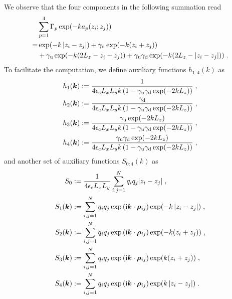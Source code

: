 We observe that the four components in the following summation read
\begin{align*}
     &\sum_{p=1}^4\Gamma_p\exp(-ka_p(z_i;z_j))\\  
     =&\exp(-k\left\lvert z_i-z_j\right\rvert)+\gamma_{\mathrm{d}}\exp(-k(z_i+z_j))\\
     &+\gamma_{\mathrm{u}}\exp(-k(2L_z-z_i-z_j)) +\gamma_{\mathrm{u}}\gamma_{\mathrm{d}}\exp(-k(2L_z-\left\lvert z_i-z_j\right\rvert))\;.
\end{align*}
To facilitate the computation, we define auxiliary functions   $h_{1:4}(k)$ as 
\begin{align*}
 h_1(\bm{k})&:= \frac{1}{4\epsilon_{\mathrm{c}} L_xL_yk\left(1-\gamma_{\mathrm{u}}\gamma_{\mathrm{d}}\exp(-2kL_z)\right)} \;,\\
  h_2(\bm{k})&:= \frac{\gamma_{\mathrm{d}}}{4\epsilon_{\mathrm{c}} L_xL_yk\left(1-\gamma_{\mathrm{u}}\gamma_{\mathrm{d}}\exp(-2kL_z)\right)} \;,\\
   h_3(\bm{k})&:= \frac{\gamma_{\mathrm{u}}\exp(-2kL_z)}{4\epsilon_{\mathrm{c}} L_xL_yk\left(1-\gamma_{\mathrm{u}}\gamma_{\mathrm{d}}\exp(-2kL_z)\right)}\;,\\
     h_4(\bm{k})&:= \frac{\gamma_{\mathrm{u}}\gamma_{\mathrm{d}}\exp(-2kL_z)}{4\epsilon_{\mathrm{c}} L_xL_yk\left(1-\gamma_{\mathrm{u}}\gamma_{\mathrm{d}}\exp(-2kL_z)\right)}\;,
\end{align*}
and another set of auxiliary functions   $S_{0:4}(k)$ as
\begin{align*} 
S_0&:=\frac{1}{4\epsilon_{\mathrm{c}} L_xL_y}\sum_{i,j=1}^Nq_iq_j {\left\lvert z_i-z_j\right\rvert}\;,\\
S_1(\bm{k})&:=\sum_{i,j=1}^Nq_iq_j  \exp{(\mathrm{i} \boldsymbol{k} \cdot \boldsymbol{\rho}_{ij})}\exp(-k\left\lvert z_i-z_j\right\rvert)\;,\\
S_2(\bm{k})&:=\sum_{i,j=1}^Nq_iq_j  \exp{(\mathrm{i} \boldsymbol{k} \cdot \boldsymbol{\rho}_{ij})}\exp(-k(z_i+z_j))\;,\\
S_3(\bm{k})&:=\sum_{i,j=1}^Nq_iq_j  \exp{(\mathrm{i} \boldsymbol{k} \cdot \boldsymbol{\rho}_{ij})}\exp(k(z_i+z_j))\;,\\
S_4(\bm{k})&:=\sum_{i,j=1}^Nq_iq_j \exp{(\mathrm{i} \boldsymbol{k} \cdot \boldsymbol{\rho}_{ij})}\exp(k\left\lvert z_i-z_j\right\rvert)\;.
\end{align*}
